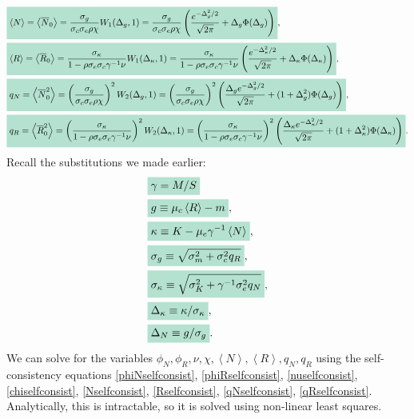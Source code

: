 \documentclass[10pt]{article}
\newcommand{\mathcolorbox}[1]{\colorbox{hlcol}{$\displaystyle #1$}}
\newcommand{\eval}[1]{\left\langle #1 \right\rangle}
\begin{document}
\begin{align}
	&
	\label{Nselfconsist}
	\mathcolorbox{
	\eval{N}
	=
	\eval{
		\overline N_0
	}
	=
	\frac{\sigma_g}{\sigma_c\sigma_e\rho\chi}
	W_1(\Delta_g,1)
	=
	\frac{\sigma_g}{\sigma_c\sigma_e\rho\chi}
	\left(
		\frac{e^{-\Delta_g^2/2}}{\sqrt{2\pi}}
		+
		\Delta_g \Phi(\Delta_g)
	\right)},
	\\
	&
	\label{Rselfconsist}
	\mathcolorbox{\eval{R}
	=
	\eval{\overline R_0}
	=
	\frac{\sigma_\kappa}{1-\rho \sigma_e \sigma_c \gamma^{-1}\nu}
	W_1(\Delta_\kappa,1)
	=
	\frac{\sigma_\kappa}{1-\rho \sigma_e \sigma_c \gamma^{-1}\nu}
	\left(
		\frac{e^{-\Delta_\kappa^2/2}}{\sqrt{2\pi}}
		+
		\Delta_\kappa \Phi(\Delta_\kappa)
	\right)},
	\\
	&
	\label{qNselfconsist}
	\mathcolorbox{
	q_N
	=
	\eval{\overline N_0^2}
	=
	\left(
		\frac{\sigma_g}{\sigma_c\sigma_e\rho\chi}
	\right)^2
	W_2(\Delta_g,1)
	=
	\left(
		\frac{\sigma_g}{\sigma_c\sigma_e\rho\chi}
	\right)^2
	\left(
		\frac{\Delta_g e^{-\Delta_g^2/2}}{\sqrt{2\pi}}
		+
		(1+\Delta_g^2)
		\Phi(\Delta_g)
	\right)},
	\\
	&
	\label{qRselfconsist}
	\mathcolorbox{
	q_R
	=
	\eval{\overline R_0^2}
	=
	\left(
		\frac{\sigma_\kappa}{1-\rho \sigma_e \sigma_c \gamma^{-1}\nu}
	\right)^2
	W_2(\Delta_\kappa,1)
	=
	\left(
		\frac{\sigma_\kappa}{1-\rho \sigma_e \sigma_c \gamma^{-1}\nu}
	\right)^2
	\left(
		\frac{\Delta_\kappa e^{-\Delta_\kappa^2/2}}{\sqrt{2\pi}}
		+
		(1+\Delta_\kappa^2)\Phi(\Delta_\kappa)
	\right)}.
\end{align}
Recall the substitutions we made earlier:
\begin{align}
	&\mathcolorbox{\gamma = M/S}
	\\
	&
	\mathcolorbox{
		g 
	\equiv
	\mu_c \eval{R}
	-
	m},
	\\
	&
	\mathcolorbox{
	\kappa
	\equiv
	K 
	-
	\mu_e \gamma^{-1} \eval{N}},
	\\
	&
	\mathcolorbox{
		\sigma_g
		\equiv
		\sqrt{\sigma_m^2 + \sigma_c^2 q_R}
	},
	\\
	&
	\mathcolorbox{
		\sigma_\kappa \equiv
		\sqrt{\sigma_K^2 + \gamma^{-1}\sigma_e^2 q_N}
	},
	\\
	&
	\mathcolorbox{
		\Delta_\kappa \equiv \kappa/\sigma_\kappa
	},
	\\
	&
	\mathcolorbox{
		\Delta_N \equiv g/\sigma_g
	}.
\end{align}
We can solve for the variables $\phi_N, \phi_R, \nu, \chi, \eval{N}, \eval{R}, q_N, q_R$ using the self-consistency equations \ref{phiNselfconsist}, \ref{phiRselfconsist}, \ref{nuselfconsist}, \ref{chiselfconsist}, \ref{Nselfconsist}, \ref{Rselfconsist}, \ref{qNselfconsist}, \ref{qRselfconsist}.
Analytically, this is intractable, so it is solved using non-linear least squares.
\end{document}
